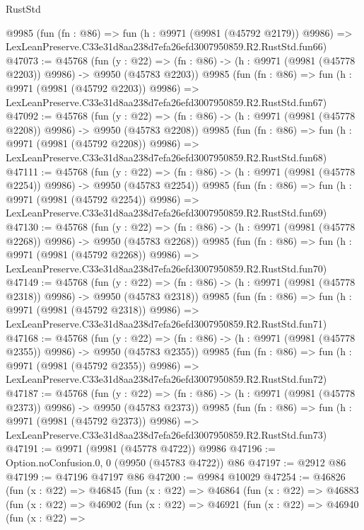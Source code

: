 \begin{lexlean}{RustStd}
\begin{coremodule}
    @9985
    (fun (fn : @86) =>
    fun (h : @9971 (@9981 (@45792 @2179)) @9986) =>
    LexLeanPreserve.C33e31d8aa238d7efa26efd3007950859.R2.RustStd.fun66)
@47073 := @45768
    (fun (y : @22) =>
    (fn : @86) -> (h : @9971 (@9981 (@45778 @2203)) @9986) -> @9950 (@45783 @2203))
    @9985
    (fun (fn : @86) =>
    fun (h : @9971 (@9981 (@45792 @2203)) @9986) =>
    LexLeanPreserve.C33e31d8aa238d7efa26efd3007950859.R2.RustStd.fun67)
@47092 := @45768
    (fun (y : @22) =>
    (fn : @86) -> (h : @9971 (@9981 (@45778 @2208)) @9986) -> @9950 (@45783 @2208))
    @9985
    (fun (fn : @86) =>
    fun (h : @9971 (@9981 (@45792 @2208)) @9986) =>
    LexLeanPreserve.C33e31d8aa238d7efa26efd3007950859.R2.RustStd.fun68)
@47111 := @45768
    (fun (y : @22) =>
    (fn : @86) -> (h : @9971 (@9981 (@45778 @2254)) @9986) -> @9950 (@45783 @2254))
    @9985
    (fun (fn : @86) =>
    fun (h : @9971 (@9981 (@45792 @2254)) @9986) =>
    LexLeanPreserve.C33e31d8aa238d7efa26efd3007950859.R2.RustStd.fun69)
@47130 := @45768
    (fun (y : @22) =>
    (fn : @86) -> (h : @9971 (@9981 (@45778 @2268)) @9986) -> @9950 (@45783 @2268))
    @9985
    (fun (fn : @86) =>
    fun (h : @9971 (@9981 (@45792 @2268)) @9986) =>
    LexLeanPreserve.C33e31d8aa238d7efa26efd3007950859.R2.RustStd.fun70)
@47149 := @45768
    (fun (y : @22) =>
    (fn : @86) -> (h : @9971 (@9981 (@45778 @2318)) @9986) -> @9950 (@45783 @2318))
    @9985
    (fun (fn : @86) =>
    fun (h : @9971 (@9981 (@45792 @2318)) @9986) =>
    LexLeanPreserve.C33e31d8aa238d7efa26efd3007950859.R2.RustStd.fun71)
@47168 := @45768
    (fun (y : @22) =>
    (fn : @86) -> (h : @9971 (@9981 (@45778 @2355)) @9986) -> @9950 (@45783 @2355))
    @9985
    (fun (fn : @86) =>
    fun (h : @9971 (@9981 (@45792 @2355)) @9986) =>
    LexLeanPreserve.C33e31d8aa238d7efa26efd3007950859.R2.RustStd.fun72)
@47187 := @45768
    (fun (y : @22) =>
    (fn : @86) -> (h : @9971 (@9981 (@45778 @2373)) @9986) -> @9950 (@45783 @2373))
    @9985
    (fun (fn : @86) =>
    fun (h : @9971 (@9981 (@45792 @2373)) @9986) =>
    LexLeanPreserve.C33e31d8aa238d7efa26efd3007950859.R2.RustStd.fun73)
@47191 := @9971 (@9981 (@45778 @4722)) @9986
@47196 := Option.noConfusion.{0, 0} (@9950 (@45783 @4722)) @86
@47197 := @2912 @86
@47199 := @47196 @47197 @86
@47200 := @9984 @10029
@47254 := @46826
    (fun (x : @22) =>
    @46845
      (fun (x : @22) =>
      @46864
        (fun (x : @22) =>
        @46883
          (fun (x : @22) =>
          @46902
            (fun (x : @22) =>
            @46921
              (fun (x : @22) =>
              @46940
                (fun (x : @22) =>

\end{coremodule}
\end{lexlean}

